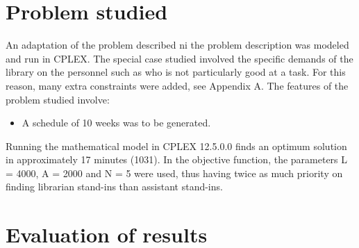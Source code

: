 

\section{Problem studied}

An adaptation of the problem described ni the problem description was modeled and run in CPLEX. The special case studied involved the specific demands of the library on the personnel such as who is not particularly good at a task. For this reason, many extra constraints were added, see Appendix A. The features of the problem studied involve:


\begin{itemize}
\item A schedule of 10 weeks was to be generated.
\end{itemize}


Running the mathematical model in CPLEX 12.5.0.0 finds an optimum solution in approximately 17 minutes (1031). In the objective function, the parameters L = 4000, A = 2000 and N = 5 were used, thus having twice as much priority on finding librarian stand-ins than assistant stand-ins.
 

\iffalse
Other parameters include:

\begin{itemize}
\item the number of allowed PL per week, which was one
\item the number of allowed PL in 10 weeks, which was three
\item the number of tasks which can be placed on the same shift time during a week, which was two
\end{itemize}
\fi



\section{Evaluation of results}


